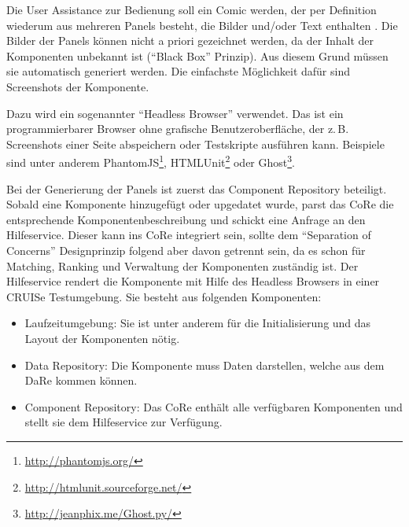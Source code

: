 \documentclass[
	headsepline,
	footsepline,
	fontsize=12pt,
	bibliography=totoc
]{scrbook}
\begin{document}


Die User Assistance zur Bedienung soll ein Comic werden, der per Definition wiederum aus mehreren Panels besteht, die Bilder und/oder Text enthalten \cite{McCloud1994}. Die Bilder der Panels können nicht a priori gezeichnet werden, da der Inhalt der Komponenten unbekannt ist (\enquote{Black Box} Prinzip). Aus diesem Grund müssen sie automatisch generiert werden. Die einfachste Möglichkeit dafür sind Screenshots der Komponente.


Dazu wird ein sogenannter \enquote{Headless Browser} verwendet. Das ist ein programmierbarer Browser ohne grafische Benutzeroberfläche, der z.\,B. Screenshots einer Seite abspeichern oder Testskripte ausführen kann. Beispiele sind unter anderem PhantomJS\footnote{\url{http://phantomjs.org/}}, HTMLUnit\footnote{\url{http://htmlunit.sourceforge.net/}} oder Ghost\footnote{\url{http://jeanphix.me/Ghost.py/}}.


Bei der Generierung der Panels ist zuerst das Component Repository beteiligt. Sobald eine Komponente hinzugefügt oder upgedatet wurde, parst das CoRe die entsprechende Komponentenbeschreibung und schickt eine Anfrage an den Hilfeservice. Dieser kann ins CoRe integriert sein, sollte dem \enquote{Separation of Concerns} Designprinzip folgend aber davon getrennt sein, da es schon für Matching, Ranking und Verwaltung der Komponenten zuständig ist. Der Hilfeservice rendert die Komponente mit Hilfe des Headless Browsers in einer CRUISe Testumgebung. Sie besteht aus folgenden Komponenten:


\begin{itemize}
	\item Laufzeitumgebung: Sie ist unter anderem für die Initialisierung und das Layout der Komponenten nötig.
	\item Data Repository: Die Komponente muss Daten darstellen, welche aus dem DaRe kommen können.
	\item Component Repository: Das CoRe enthält alle verfügbaren Komponenten und stellt sie dem Hilfeservice zur Verfügung.
\end{itemize}
\end{document}
